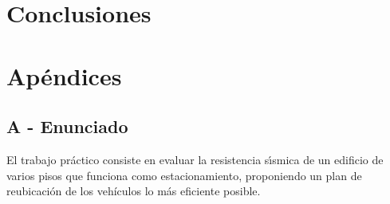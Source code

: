 \documentclass[a4paper]{article}
\begin{document}


\newpage

\section{Conclusiones}

\newpage

\section{Apéndices}
\subsection{A - Enunciado}

El trabajo pr\'actico consiste en evaluar la resistencia s\'\i smica de un
edificio de varios pisos que funciona como estacionamiento, proponiendo un plan de
reubicaci\'on de los veh\'iculos lo m\'as eficiente posible.\\
\end{document}
